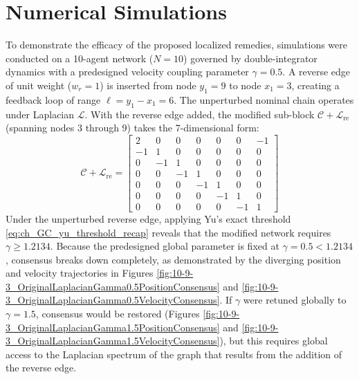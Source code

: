 \section{Numerical Simulations}\label{sec:ch_GC_simulations}
To demonstrate the efficacy of the proposed localized remedies, simulations were conducted on a 10-agent network ($N = 10$) governed by double-integrator dynamics with a predesigned velocity coupling parameter $\gamma = 0.5$.
A reverse edge of unit weight ($w_r = 1$) is inserted from node $y_1 = 9$ to node $x_1 = 3$, creating a feedback loop of range $\ell = y_1 - x_1 = 6$. The unperturbed nominal chain operates under Laplacian $\mathcal{L}$. With the reverse edge added, the modified sub-block $\mathcal{C} + \mathcal{L}_{\text{re}}$ (spanning nodes 3 through 9) takes the 7-dimensional form:
\begin{equation} \label{eq:ch_GC_ExampleLaplacian_block}
	\mathcal{C} + \mathcal{L}_{\text{re}} = \begin{bmatrix}
		2 & 0 & 0 & 0 & 0 & 0 & -1 \\
		-1 & 1 & 0 & 0 & 0 & 0 & 0 \\
		0 & -1 & 1 & 0 & 0 & 0 & 0 \\
		0 & 0 & -1 & 1 & 0 & 0 & 0 \\
		0 & 0 & 0 & -1 & 1 & 0 & 0 \\
		0 & 0 & 0 & 0 & -1 & 1 & 0 \\
		0 & 0 & 0 & 0 & 0 & -1 & 1
	\end{bmatrix}
\end{equation}
Under the unperturbed reverse edge, applying Yu's exact threshold \eqref{eq:ch_GC_yu_threshold_recap} reveals that the modified network requires $\gamma \ge 1.2134$. Because the predesigned global parameter is fixed at $\gamma = 0.5 < 1.2134$, consensus breaks down completely, as demonstrated by the diverging position and velocity trajectories in Figures \ref{fig:10-9-3_OriginalLaplacianGamma0.5PositionConsensus} and \ref{fig:10-9-3_OriginalLaplacianGamma0.5VelocityConsensus}. If $\gamma$ were retuned globally to $\gamma = 1.5$, consensus would be restored (Figures \ref{fig:10-9-3_OriginalLaplacianGamma1.5PositionConsensus} and \ref{fig:10-9-3_OriginalLaplacianGamma1.5VelocityConsensus}), but this requires global access to the Laplacian spectrum of the graph that results from the addition of the reverse edge.
